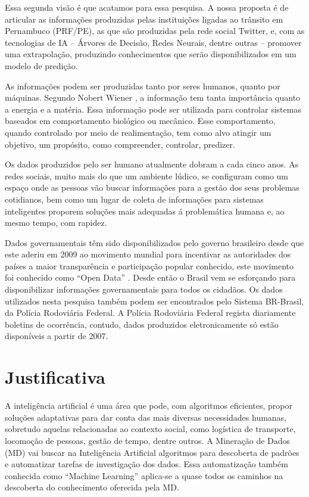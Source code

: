 Essa segunda visão é que acatamos para essa pesquisa. A nossa proposta é de articular as informações produzidas pelas instituições ligadas ao trânsito em Pernambuco (PRF/PE), as que são produzidas pela rede social Twitter, e, com as tecnologias de IA -- Árvores de Decisão, Redes Neurais, dentre outras -- promover uma extrapolação, produzindo conhecimentos que serão disponibilizados em um modelo de predição.

As informações podem ser produzidas tanto por seres humanos, quanto por máquinas. Segundo Nobert Wiener \cite{Salles2007}, a informação tem tanta importância quanto a energia e a matéria. Essa informação pode ser utilizada para controlar sistemas baseados em comportamento biológico ou mecânico. Esse comportamento, quando controlado por meio de realimentação, tem como alvo atingir um objetivo, um propósito, como compreender, controlar, predizer.

Os dados produzidos pelo ser humano atualmente dobram a cada cinco anos. As redes sociais, muito mais do que um ambiente lúdico, se configuram como um espaço onde as pessoas vão buscar informações para a gestão dos seus problemas cotidianos, bem como um lugar de coleta de informações para sistemas inteligentes proporem soluções mais adequadas á problemática humana e, ao mesmo tempo, com rapidez.

Dados governamentais têm sido disponibilizados pelo governo brasileiro desde que este aderiu em 2009 ao movimento mundial para incentivar as autoridades dos países a maior transparência e participação popular conhecido, este movimento foi conhecido como ``Open Data'' \cite{DadosGoverno}. Desde então o Brasil vem se esforçando para disponibilizar informações governamentais para todos os cidadãos. Os dados utilizados nesta pesquisa também podem ser encontrados pelo Sistema BR-Brasil, da Polícia Rodoviária Federal. A Polícia Rodoviária Federal regista diariamente boletins de ocorrência, contudo, dados produzidos eletronicamente só estão disponíveis a partir de 2007.


\section{Justificativa}

A inteligência artificial é uma área que pode, com algoritmos eficientes, propor soluções adaptativas para dar conta das mais diversas necessidades humanas, sobretudo aquelas relacionadas ao contexto social, como logística de transporte, locomoção de pessoas, gestão de tempo, dentre outros. A Mineração de Dados (MD) vai buscar na Inteligência Artificial algoritmos para descoberta de padrões e automatizar tarefas de investigação dos dados. Essa automatização também conhecida como ``Machine Learning'' aplica-se a quase todos os caminhos na descoberta do conhecimento oferecida pela MD.
 
